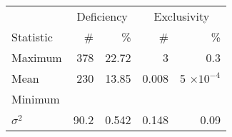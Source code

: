 
\begin{tabular}{|l|r|r|r|r|} \hline

 & \multicolumn{2}{|c|}{Deficiency} & \multicolumn{2}{c|}{Exclusivity} \\ \cline{2-5}
Statistic & \#     & \%     & \#      & \%     \\ \hline \hline
Maximum   & 378    & 22.72   & 3      & 0.3    \\ \hline
Mean      & 230    & 13.85   & 0.008  & 5 $\times 10^{-4}$    \\ \hline
Minimum   &        &         &        &        \\ \hline
$\sigma^2$& 90.2   & 0.542   & 0.148  & 0.09   \\ \hline

\end{tabular}

